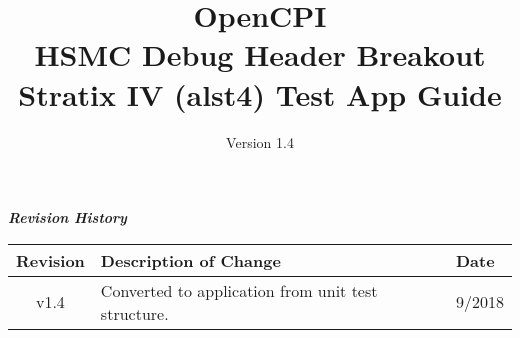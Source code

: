 \iffalse
This file is protected by Copyright. Please refer to the COPYRIGHT file
distributed with this source distribution.

This file is part of OpenCPI <http://www.opencpi.org>

OpenCPI is free software: you can redistribute it and/or modify it under the
terms of the GNU Lesser General Public License as published by the Free Software
Foundation, either version 3 of the License, or (at your option) any later
version.

OpenCPI is distributed in the hope that it will be useful, but WITHOUT ANY
WARRANTY; without even the implied warranty of MERCHANTABILITY or FITNESS FOR A
PARTICULAR PURPOSE. See the GNU Lesser General Public License for more details.

You should have received a copy of the GNU Lesser General Public License along
with this program. If not, see <http://www.gnu.org/licenses/>.
\fi

\def\docTitle{OpenCPI\\ HSMC Debug Header Breakout Stratix IV (alst4) Test App Guide}
\def\docVersion{1.4}

\date{Version \docVersion} %
\title{\docTitle}
\usepackage{graphicx}
\graphicspath{ {figures/} }
\usepackage{textcomp}
\usepackage{listings}


\maketitle
	\begin{center}
	\textit{\textbf{Revision History}}
		\begin{table}[H]
		\label{table:revisions} %
			\begin{tabularx}{\textwidth}{|c|X|l|}
			\hline
			\rowcolor{blue}
			\textbf{Revision} & \textbf{Description of Change} & \textbf{Date} \\
		    \hline
		    v1.4 & Converted to application from unit test structure. & 9/2018 \\
			\hline
			\end{tabularx}
		\end{table}
	\end{center}


